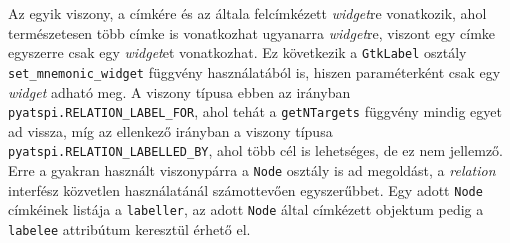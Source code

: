 Az egyik viszony, a címkére és az általa felcímkézett \textit{widget}re vonatkozik, ahol természetesen több címke is vonatkozhat ugyanarra \textit{widget}re, viszont egy címke egyszerre csak egy \textit{widget}et vonatkozhat. Ez következik a \texttt{GtkLabel} osztály \texttt{set\_mnemonic\_widget} függvény használatából is, hiszen paraméterként csak egy \textit{widget} adható meg. A viszony típusa ebben az irányban \texttt{pyatspi.RELATION\_LABEL\_FOR}, ahol tehát a \texttt{getNTargets} függvény mindig egyet ad vissza, míg az ellenkező irányban a viszony típusa \texttt{pyatspi.RELATION\_LABELLED\_BY}, ahol több cél is lehetséges, de ez nem jellemző. Erre a gyakran használt viszonypárra a \texttt{Node} osztály is ad megoldást, a \textit{relation} interfész közvetlen használatánál számottevően egyszerűbbet. Egy adott \texttt{Node} címkéinek listája a \texttt{labeller}, az adott \texttt{Node} által címkézett objektum pedig a \texttt{labelee} attribútum keresztül érhető el.

